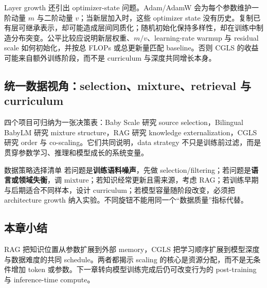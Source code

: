 Layer growth 还引出 optimizer-state 问题。Adam/AdamW 会为每个参数维护一阶动量 $m$ 与二阶动量 $v$；当新层加入时，这些 optimizer state 没有历史。复制已有层可继承表示，却可能造成层间同质化；随机初始化保持多样性，却在训练中制造分布突变。公平比较应说明新层权重、$m/v$、learning-rate warmup 与 residual scale 如何初始化，并按总 FLOPs 或总更新量匹配 baseline。否则 CGLS 的收益可能来自额外训练阶段，而不是 curriculum 与深度共同增长本身。

\subsection{统一数据视角：selection、mixture、retrieval 与 curriculum}

四个项目可归纳为一张决策表：Baby Scale 研究 source selection，Bilingual BabyLM 研究 mixture structure，RAG 研究 knowledge externalization，CGLS 研究 order 与 co-scaling。它们共同说明，data strategy 不只是训练前过滤，而是贯穿参数学习、推理和模型成长的系统变量。




\begin{importantbox}{数据策略选择清单}
若问题是\textbf{训练语料噪声}，先做 selection/filtering；若问题是\textbf{语言或领域失衡}，调 mixture；若知识经常更新且需来源，考虑 RAG；若训练早期与后期适合不同样本，设计 curriculum；若模型容量随阶段改变，必须把 architecture growth 纳入实验。不同旋钮不能用同一个“数据质量”指标代替。
\end{importantbox}

\subsection{本章小结}

RAG 把知识位置从参数扩展到外部 memory，CGLS 把学习顺序扩展到模型深度与数据难度的共同 schedule。两者都揭示 scaling 的核心是资源分配，而不是无条件增加 token 或参数。下一章转向模型训练完成后仍可改变行为的 post-training 与 inference-time compute。

